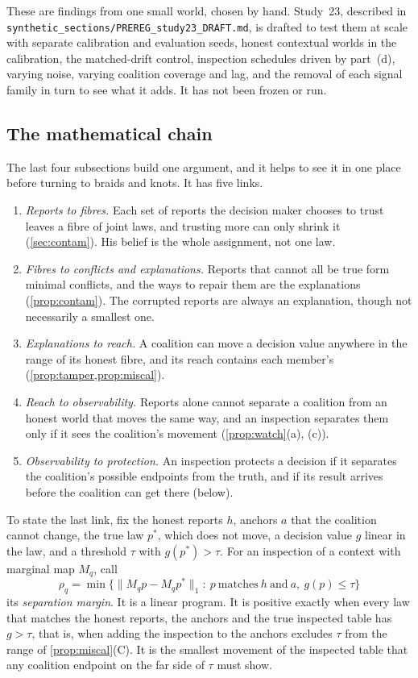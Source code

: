 \documentclass[11pt]{article}
\theoremstyle{definition}\newtheorem{definition}[theorem]{Definition}\newtheorem{remark}[theorem]{Remark}\newtheorem{example}[theorem]{Example}\newtheorem{problem}[theorem]{Open problem}\crefname{problem}{Problem}{Problems}
\begin{document}
These are findings from one small world, chosen by hand. Study~23, described in \texttt{synthetic\_sections/PREREG\_study23\_DRAFT.md}, is drafted to test them at scale with separate calibration and evaluation seeds, honest contextual worlds in the calibration, the matched-drift control, inspection schedules driven by part~(d), varying noise, varying coalition coverage and lag, and the removal of each signal family in turn to see what it adds. It has not been frozen or run.

\subsection{The mathematical chain}\label{sec:chain}
The last four subsections build one argument, and it helps to see it in one place before turning to braids and knots. It has five links.
\begin{enumerate}
\item \emph{Reports to fibres.} Each set of reports the decision maker chooses to trust leaves a fibre of joint laws, and trusting more can only shrink it (\cref{sec:contam}). His belief is the whole assignment, not one law.
\item \emph{Fibres to conflicts and explanations.} Reports that cannot all be true form minimal conflicts, and the ways to repair them are the explanations (\cref{prop:contam}). The corrupted reports are always an explanation, though not necessarily a smallest one.
\item \emph{Explanations to reach.} A coalition can move a decision value anywhere in the range of its honest fibre, and its reach contains each member's (\cref{prop:tamper,prop:miscal}).
\item \emph{Reach to observability.} Reports alone cannot separate a coalition from an honest world that moves the same way, and an inspection separates them only if it sees the coalition's movement (\cref{prop:watch}(a), (c)).
\item \emph{Observability to protection.} An inspection protects a decision if it separates the coalition's possible endpoints from the truth, and if its result arrives before the coalition can get there (below).
\end{enumerate}

To state the last link, fix the honest reports $h$, anchors $a$ that the coalition cannot change, the true law $p^\ast$, which does not move, a decision value $g$ linear in the law, and a threshold $\tau$ with $g(p^\ast)>\tau$. For an inspection of a context with marginal map $M_q$, call
\[
\rho_q=\min\big\{\|M_q p-M_q p^\ast\|_1:\ p\ \text{matches}\ h\ \text{and}\ a,\ g(p)\le\tau\big\}
\]
its \emph{separation margin}. It is a linear program. It is positive exactly when every law that matches the honest reports, the anchors and the true inspected table has $g>\tau$, that is, when adding the inspection to the anchors excludes $\tau$ from the range of \cref{prop:miscal}(C). It is the smallest movement of the inspected table that any coalition endpoint on the far side of $\tau$ must show.
\end{document}
